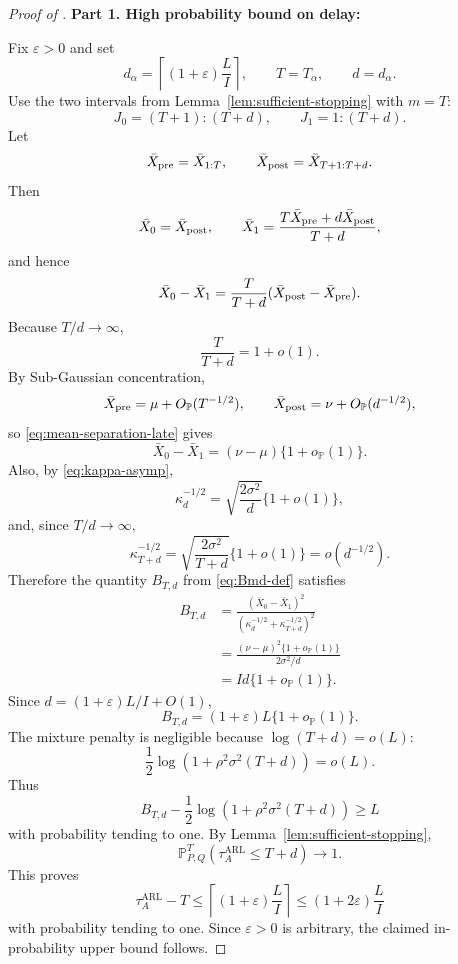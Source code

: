 \documentclass[12pt]{article}
\theoremstyle{spaced}
\theoremstyle{remark}
\newcommand{\bbP}{\mathbb P}
\begin{document}
\begin{proof}[Proof of ]
\textbf{Part 1. High probability bound on delay:}

Fix $\varepsilon>0$ and set
\[
  d_\alpha=\left\lceil(1+\varepsilon)\frac{L}{I}\right\rceil,
  \qquad
  T=T_\alpha,
  \qquad
  d=d_\alpha.
  \]
Use the two intervals from Lemma~\ref{lem:sufficient-stopping} with $m=T$:
  \[
    J_0=(T+1):(T+d),
    \qquad
    J_1=1:(T+d).
    \]
Let
\[
  \bar X_{\rm pre}=\bar X_{1:T},
  \qquad
  \bar X_{\rm post}=\bar X_{T+1:T+d}.
  \]
Then
\[
  \bar X_0=\bar X_{\rm post},
  \qquad
  \bar X_1=\frac{T\bar X_{\rm pre}+d\bar X_{\rm post}}{T+d},
  \]
and hence
\begin{equation}
\label{eq:mean-separation-late}
\bar X_0-\bar X_1
=
  \frac{T}{T+d}(\bar X_{\rm post}-\bar X_{\rm pre}).
\end{equation}
Because $T/d\to\infty$,
\[
  \frac{T}{T+d}=1+o(1).
  \]
By Sub-Gaussian concentration,
\[
  \bar X_{\rm pre}=\mu+O_{\bbP}(T^{-1/2}),
  \qquad
  \bar X_{\rm post}=\nu+O_{\bbP}(d^{-1/2}),
  \]
so \eqref{eq:mean-separation-late} gives
\begin{equation}
\label{eq:sep-is-delta}
\bar X_0-\bar X_1
=
  (\nu-\mu)\{1+o_{\bbP}(1)\}.
\end{equation}
Also, by \eqref{eq:kappa-asymp},
\[
  \kappa_d^{-1/2}
  =
    \sqrt{\frac{2\sigma^2}{d}}\{1+o(1)\},
  \]
and, since $T/d\to\infty$,
\[
  \kappa_{T+d}^{-1/2}
  =
    \sqrt{\frac{2\sigma^2}{T+d}}\{1+o(1)\}
  =o(d^{-1/2}).
  \]
Therefore the quantity $B_{T,d}$ from \eqref{eq:Bmd-def} satisfies
\begin{align*}
B_{T,d}
&=
  \frac{(\bar X_0-\bar X_1)^2}
{(\kappa_d^{-1/2}+\kappa_{T+d}^{-1/2})^2} \\
&=
  \frac{(\nu-\mu)^2\{1+o_{\bbP}(1)\}}
{2\sigma^2/d}\nonumber\\
&=
  I d\{1+o_{\bbP}(1)\}.
\end{align*}
Since $d=(1+\varepsilon)L/I+O(1)$,
\[
  B_{T,d}=(1+\varepsilon)L\{1+o_{\bbP}(1)\}.
  \]
The mixture penalty is negligible because $\log(T+d)=o(L)$:
  \[
    \frac12\log(1+\rho^2\sigma^2(T+d))=o(L).
    \]
Thus
\[
  B_{T,d}
  -\frac12\log(1+\rho^2\sigma^2(T+d))
  \ge L
  \]
with probability tending to one.  By Lemma~\ref{lem:sufficient-stopping},
\[
  \bbP^T_{P,Q}(\tau_A^{\mathrm{ARL}}\le T+d)\to 1.
  \]
This proves
\[
  \tau_A^{\mathrm{ARL}}-T\le \left\lceil(1+\varepsilon)\frac{L}{I}\right\rceil\le(1+2\varepsilon)\frac{L}{I}
  \]
with probability tending to one.  Since $\varepsilon>0$ is arbitrary, the claimed in-probability upper bound follows.


\end{proof}
\end{document}
